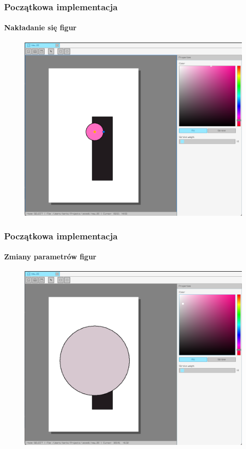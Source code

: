 \documentclass[
	11pt,]{beamer}
\begin{document}
\begin{frame}
	\frametitle{Początkowa implementacja}
	\framesubtitle{Nakładanie się figur}
	
	\begin{figure}
		\includegraphics[height=0.7\textheight]{figures/pro6.png}
	\end{figure}
\end{frame}

\begin{frame}
	\frametitle{Początkowa implementacja}
	\framesubtitle{Zmiany parametrów figur}
	
	\begin{figure}
		\includegraphics[height=0.7\textheight]{figures/pro7.png}
	\end{figure}
\end{frame}
\end{document}
